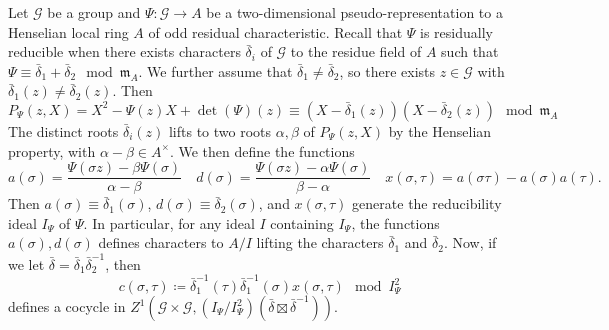 \documentclass[leqno]{amsart}
\theoremstyle{definition}
\theoremstyle{remark}
\newcommand{\fm}{\mathfrak{m}}
\begin{document}
Let $\mathcal{G}$ be a group and 
$\Psi\colon \mathcal{G}\to A$
be a two-dimensional pseudo-representation
to a Henselian local ring $A$
of odd residual characteristic.
Recall that 
$\Psi$ is residually reducible
when there exists characters
$ \bar{\delta}_i$ of $\mathcal{G}$
to the residue field of  $A$
such that  
$\Psi\equiv \bar{\delta}_1+\bar{\delta}_2\mod \fm_A$.
We further assume that $\bar{\delta}_1\neq \bar{\delta}_2$,
so there exists $z\in \mathcal{G}$
with  $\bar{\delta}_1(z)\neq \bar{\delta}_2(z)$.
Then
\begin{equation}
    P_\Psi(z,X)=
    X^2-\Psi(z)X+\det(\Psi)(z) \equiv 
    (X-\bar{\delta}_1(z))(X-\bar{\delta}_2(z))
    \mod \fm_A
\end{equation}
The distinct roots $\bar{\delta}_i(z)$
lifts to two roots $\alpha,\beta$ of  $P_\Psi(z,X)$
by the Henselian property,
with $\alpha-\beta\in A^\times$.
We then define the functions
\begin{equation}
   a(\sigma)=
   \frac{\Psi(\sigma z)-\beta\Psi(\sigma)}{\alpha-\beta}\quad
   d(\sigma)=
   \frac{\Psi(\sigma z)-\alpha\Psi(\sigma)}{\beta-\alpha}\quad
   x(\sigma,\tau)=a(\sigma\tau)-a(\sigma)a(\tau).
\end{equation}
Then 
$a(\sigma)\equiv \bar{\delta}_1(\sigma)$,
$d(\sigma)\equiv \bar{\delta}_2(\sigma)$,
and $x(\sigma,\tau)$
generate the reducibility ideal
$I_\Psi$ of  $\Psi$.
In particular,
for any ideal $I$ containing $I_\Psi$,
the functions $a(\sigma),d(\sigma)$
defines characters to  $A/I$
lifting the characters
$\bar{\delta}_1$ and $\bar{\delta}_2$.
Now, if we let
$\bar{\delta}=\bar{\delta}_1\bar{\delta}_2^{-1}$, then
\begin{equation*}
    c(\sigma,\tau)\coloneqq \bar{\delta}_1^{-1}(\tau)
    \bar{\delta}_1^{-1}(\sigma)x(\sigma, \tau)\mod I_\Psi^2
\end{equation*}
defines a cocycle in 
$Z^1(\mathcal{G}\times \mathcal{G}, 
(I_\Psi/I_\Psi^2)(\bar{\delta}\boxtimes \bar{\delta}^{-1}))$.
\end{document}
